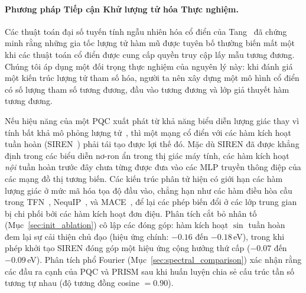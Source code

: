 \documentclass[10pt,twocolumn,letterpaper]{article}
\begin{document}
\paragraph{Phương pháp Tiếp cận Khử lượng tử hóa Thực nghiệm.}
Các thuật toán đại số tuyến tính ngẫu nhiên hóa cổ điển của Tang~\cite{Tang:2018lmw} đã chứng minh rằng những gia tốc lượng tử hàm mũ được tuyên bố thường biến mất một khi các thuật toán cổ điển được cung cấp quyền truy cập lấy mẫu tương đương. Chúng tôi áp dụng một đối trọng thực nghiệm của nguyên lý này: khi đánh giá một kiến trúc lượng tử tham số hóa, người ta nên xây dựng một mô hình cổ điển có số lượng tham số tương đương, đầu vào tương đương và lớp giả thuyết hàm tương đương.

Nếu hiệu năng của một PQC xuất phát từ khả năng biểu diễn lượng giác thay vì tính bất khả mô phỏng lượng tử~\cite{Cerezo:2023nqf, landman2023approximating}, thì một mạng cổ điển với các hàm kích hoạt tuần hoàn (SIREN~\cite{sitzmann2020siren}) phải tái tạo được lợi thế đó. Mặc dù SIREN đã được khẳng định trong các biểu diễn nơ-ron ẩn trong thị giác máy tính, các hàm kích hoạt \textit{nội} tuần hoàn trước đây chưa từng được đưa vào các MLP truyền thông điệp của các mạng đồ thị tương biến. Các kiến trúc phân tử hiện có giới hạn các hàm lượng giác ở mức mã hóa tọa độ đầu vào, chẳng hạn như các hàm điều hòa cầu trong TFN~\cite{thomasTensorFieldNetworks2018}, NequIP~\cite{batznerE3equivariantGraphNeural2021}, và MACE~\cite{batatiaMACEHigherOrder2022}, để lại các phép biến đổi ở các lớp trung gian bị chi phối bởi các hàm kích hoạt đơn điệu.
Phân tích cắt bỏ nhân tố (Mục~\ref{sec:init_ablation}) cô lập các đóng góp: hàm kích hoạt $\sin$ tuần hoàn đem lại sự cải thiện chủ đạo (hiệu ứng chính: $-0.16$ đến $-0.18$\,eV), trong khi phép khởi tạo SIREN đóng góp một hiệu ứng cộng hưởng thứ cấp ($-0.07$ đến $-0.09$\,eV). Phân tích phổ Fourier (Mục~\ref{sec:spectral_comparison}) xác nhận rằng các đầu ra cạnh của PQC và PRISM sau khi huấn luyện chia sẻ cấu trúc tần số tương tự nhau (độ tương đồng cosine $= 0.90$).
\end{document}
